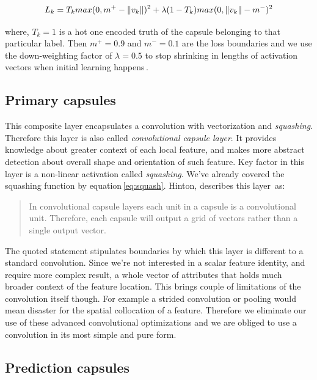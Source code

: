 \begin{equation}
    L_k = T_k max(0, m^+ - \left\lVert v_k \right\rVert)^2 + \lambda (1 - T_k) max(0, \left\lVert v_k \right\rVert - m^-)^2
    \label{eq:margin_loss}
\end{equation}

where, $T_k = 1$ is a hot one encoded truth of the capsule belonging to that particular label. Then $m^+ = 0.9$ and $m^- = 0.1$ are the loss boundaries and we use the down-weighting factor of $\lambda = 0.5$ to stop shrinking in lengths of activation vectors when initial learning happens\,\cite{capsule}.

\subsection{Primary capsules}

This composite layer encapsulates a convolution with vectorization and \textit{squashing}. Therefore this layer is also called \textit{convolutional capsule layer}. It provides knowledge about greater context of each local feature, and makes more abstract detection about overall shape and orientation of such feature. Key factor in this layer is a non-linear activation called \textit{squashing}. We've already covered the squashing function by equation\,\ref{eq:squash}. Hinton, describes this layer\,\cite{capsule} as:

\begin{quotation}
    In convolutional capsule layers each unit in a capsule is a convolutional unit. Therefore, each capsule will output a grid of vectors rather than a single output vector.
\end{quotation}

The quoted statement stipulates boundaries by which this layer is different to a standard convolution. Since we're not interested in a scalar feature identity, and require more complex result, a whole vector of attributes that holds much broader context of the feature location. This brings couple of limitations of the convolution itself though. For example a strided convolution or pooling would mean disaster for the spatial collocation of a feature. Therefore we eliminate our use of these advanced convolutional optimizations and we are obliged to use a convolution in its most simple and pure form.

\subsection{Prediction capsules}

